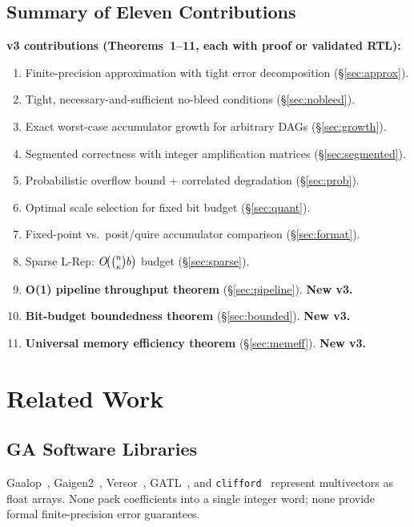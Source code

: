 \documentclass[11pt,a4paper]{article}
\theoremstyle{definition}
\theoremstyle{plain}
\theoremstyle{remark}
\begin{document}
\subsection{Summary of Eleven Contributions}

\begin{contribution}
\textbf{v3 contributions (Theorems~1--11, each with proof or validated RTL):}
\begin{enumerate}[label=C\arabic*.]
  \item Finite-precision approximation with tight error decomposition (\S\ref{sec:approx}).
  \item Tight, necessary-and-sufficient no-bleed conditions (\S\ref{sec:nobleed}).
  \item Exact worst-case accumulator growth for arbitrary DAGs (\S\ref{sec:growth}).
  \item Segmented correctness with integer amplification matrices (\S\ref{sec:segmented}).
  \item Probabilistic overflow bound + correlated degradation (\S\ref{sec:prob}).
  \item Optimal scale selection for fixed bit budget (\S\ref{sec:quant}).
  \item Fixed-point vs.\ posit/quire accumulator comparison (\S\ref{sec:format}).
  \item Sparse L-Rep: $O\!\bigl(\tbinom{n}{\kappa}b\bigr)$ budget (\S\ref{sec:sparse}).
  \item \textbf{O(1) pipeline throughput theorem} (\S\ref{sec:pipeline}). \textbf{New v3.}
  \item \textbf{Bit-budget boundedness theorem} (\S\ref{sec:bounded}). \textbf{New v3.}
  \item \textbf{Universal memory efficiency theorem} (\S\ref{sec:memeff}). \textbf{New v3.}
\end{enumerate}
\end{contribution}

\section{Related Work}
\label{sec:related}

\subsection{GA Software Libraries}

Gaalop~\cite{gaalop}, Gaigen2~\cite{fontijne2007}, Versor~\cite{versor},
GATL~\cite{gatl}, and \texttt{clifford}~\cite{clifford_py} represent
multivectors as float arrays.
None pack coefficients into a single integer word; none provide formal
finite-precision error guarantees.
\end{document}
